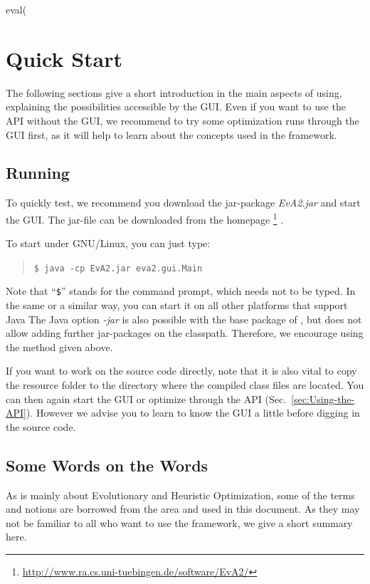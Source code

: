 eval(\chapter{Quick Start\label{sec:Quick-Start}}

The following sections give a short introduction in the main aspects
of using, explaining the possibilities accessible by the
GUI. Even if you want to use the API without the GUI, we recommend
to try some optimization runs through the GUI first, as it will help
to learn about the concepts used in the framework.


\section{Running \label{sub:Quickly-Running-JavaEvA}}

To quickly test, we recommend you download the jar-package
\emph{EvA2.jar} and start the GUI. The jar-file can be downloaded
from the  homepage%
\footnote{\url{http://www.ra.cs.uni-tuebingen.de/software/EvA2/}%
} \cite{EvA2HomePage}.

To start under GNU/Linux, you can just type:
\begin{quotation}
\texttt{\small \$ java -cp EvA2.jar eva2.gui.Main}{\small \par}
\end{quotation}
Note that ``\texttt{\$}'' stands for the command prompt, which needs
not to be typed. In the same or a similar way, you can start it on
all other platforms that support Java The Java option \emph{-jar}
is also possible with the base package of , but does not allow adding
further jar-packages on the classpath. Therefore, we encourage using
the method given above.

If you want to work on the source code directly, note that it is also
vital to copy the resource folder to the directory where the compiled
class files are located. You can then again start the GUI or optimize
through the API (Sec.~\ref{sec:Using-the-API}). However we advise
you to learn to know the GUI a little before digging in the source
code.


\section{Some Words on the Words}

As  is mainly about Evolutionary and Heuristic Optimization,
some of the terms and notions are borrowed from the area and used
in this document. As they may not be familiar to all who want to use
the framework, we give a short summary here.

